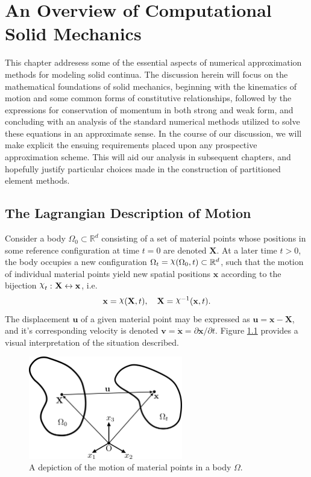 \chapter{An Overview of Computational Solid Mechanics} \label{ch:solid_mechanics}
%
This chapter addresess some of the essential aspects of numerical approximation methods for modeling solid continua. The discussion herein will focus on the mathematical foundations of solid mechanics, beginning with the kinematics of motion and some common forms of constitutive relationships, followed by the expressions for conservation of momentum in both strong and weak form, and concluding with an analysis of the standard numerical methods utilized to solve these equations in an approximate sense. In the course of our discussion, we will make explicit the ensuing requirements placed upon any prospective approximation scheme. This will aid our analysis in subsequent chapters, and hopefully justify particular choices made in the construction of partitioned element methods.

\newpage

\section{The Lagrangian Description of Motion}

Consider a body $\Omega_0 \subset \mathbb{R}^d$ consisting of a set of material points whose positions in some reference configuration at time $t = 0$ are denoted $\mathbf{X}$. At a later time $t > 0$, the body occupies a new configuration $\Omega_t = \raisebox{\depth}{$\chi$} (\Omega_0, t) \subset \mathbb{R}^d$, such that the motion of individual material points yield new spatial positions $\mathbf{x}$ according to the bijection $\raisebox{\depth}{$\chi$}_t \, \colon \mathbf{X} \leftrightarrow \mathbf{x}$, i.e.
\begin{equation}
  \mathbf{x} = \raisebox{\depth}{$\chi$} (\mathbf{X}, t), \quad \mathbf{X} = \raisebox{\depth}{$\chi$}^{-1} (\mathbf{x}, t).
\end{equation}
The displacement $\mathbf{u}$ of a given material point may be expressed as $\mathbf{u} = \mathbf{x} - \mathbf{X}$, and it's corresponding velocity is denoted $\mathbf{v} = \dot{\mathbf{x}} = \partial \mathbf{x} / \partial t$. Figure \ref{fig:kinematics} provides a visual interpretation of the situation described.
\begin{figure}[!h]
  \centering
  \includegraphics[width=0.6\textwidth]{figures/kinematics.png}
  \caption{A depiction of the motion of material points in a body $\Omega$.}
  \label{fig:kinematics}
\end{figure}


